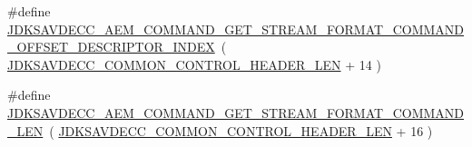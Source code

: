 \begin{DoxyCompactItemize}
\item 
\#define \hyperlink{group__command__get__stream__format_ga1cc07a4c1fb63f6cba32f90facad7a53}{J\+D\+K\+S\+A\+V\+D\+E\+C\+C\+\_\+\+A\+E\+M\+\_\+\+C\+O\+M\+M\+A\+N\+D\+\_\+\+G\+E\+T\+\_\+\+S\+T\+R\+E\+A\+M\+\_\+\+F\+O\+R\+M\+A\+T\+\_\+\+C\+O\+M\+M\+A\+N\+D\+\_\+\+O\+F\+F\+S\+E\+T\+\_\+\+D\+E\+S\+C\+R\+I\+P\+T\+O\+R\+\_\+\+I\+N\+D\+EX}~( \hyperlink{group__jdksavdecc__avtp__common__control__header_gaae84052886fb1bb42f3bc5f85b741dff}{J\+D\+K\+S\+A\+V\+D\+E\+C\+C\+\_\+\+C\+O\+M\+M\+O\+N\+\_\+\+C\+O\+N\+T\+R\+O\+L\+\_\+\+H\+E\+A\+D\+E\+R\+\_\+\+L\+EN} + 14 )
\item 
\#define \hyperlink{group__command__get__stream__format_ga46b2baee8ffa91aaab7a630e72775f46}{J\+D\+K\+S\+A\+V\+D\+E\+C\+C\+\_\+\+A\+E\+M\+\_\+\+C\+O\+M\+M\+A\+N\+D\+\_\+\+G\+E\+T\+\_\+\+S\+T\+R\+E\+A\+M\+\_\+\+F\+O\+R\+M\+A\+T\+\_\+\+C\+O\+M\+M\+A\+N\+D\+\_\+\+L\+EN}~( \hyperlink{group__jdksavdecc__avtp__common__control__header_gaae84052886fb1bb42f3bc5f85b741dff}{J\+D\+K\+S\+A\+V\+D\+E\+C\+C\+\_\+\+C\+O\+M\+M\+O\+N\+\_\+\+C\+O\+N\+T\+R\+O\+L\+\_\+\+H\+E\+A\+D\+E\+R\+\_\+\+L\+EN} + 16 )
\end{DoxyCompactItemize}
